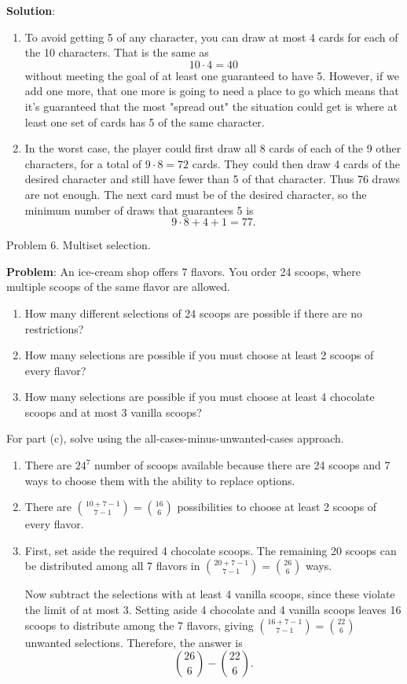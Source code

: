 \documentclass{article}
\begin{document}
\textbf{Solution}: 
\begin{enumerate}[label=(\alph*)]
    \item To avoid getting 5 of any character, you can draw at most 4 cards for each of the 10 characters. That is the same as $$10 \cdot 4 = 40$$ without meeting the goal of at least one guaranteed to have 5. However, if we add one more, that one more is going to need a place to go which means that it's guaranteed that the most "spread out" the situation could get is where at least one set of cards has 5 of the same character.
    \item In the worst case, the player could first draw all 8 cards of
each of the 9 other characters, for a total of $9\cdot8=72$ cards.
They could then draw 4 cards of the desired character and still have
fewer than 5 of that character. Thus 76 draws are not enough.
The next card must be of the desired character, so the minimum
number of draws that guarantees 5 is
\[
9\cdot8+4+1=77.
\]
\end{enumerate}

Problem 6. Multiset selection.

\textbf{Problem}: An ice-cream shop offers 7 flavors. You order 24 scoops, where multiple scoops of the same flavor are allowed.

\begin{enumerate}[label=(\alph*)]
  \item How many different selections of 24 scoops are possible if there are no restrictions?
  \item How many selections are possible if you must choose at least 2 scoops of every flavor?
  \item How many selections are possible if you must choose at least 4 chocolate scoops and at most 3 vanilla scoops?
\end{enumerate}
For part (c), solve using the all-cases-minus-unwanted-cases approach.

\begin{enumerate}[label=(\alph*)]
    \item There are $24^7$ number of scoops available because there are 24 scoops and 7 ways to choose them with the ability to replace options.
    \item There are $\binom{10 + 7 - 1}{7-1} = \binom{16}{6}$ possibilities to choose at least 2 scoops of every flavor. 
    \item First, set aside the required 4 chocolate scoops. The remaining
20 scoops can be distributed among all 7 flavors in
\(\binom{20+7-1}{7-1}=\binom{26}{6}\) ways.

Now subtract the selections with at least 4 vanilla scoops, since
these violate the limit of at most 3. Setting aside 4 chocolate and
4 vanilla scoops leaves 16 scoops to distribute among the 7 flavors,
giving \(\binom{16+7-1}{7-1}=\binom{22}{6}\) unwanted selections.
Therefore, the answer is
\[
{\binom{26}{6}-\binom{22}{6}}.
\]
\end{enumerate}
\end{document}
